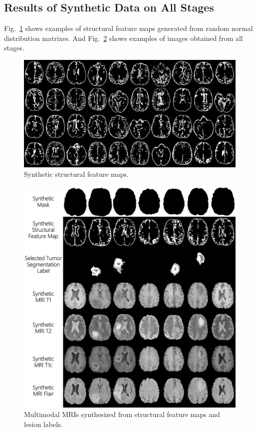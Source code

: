 \documentclass[runningheads]{llncs}
\begin{document}
\subsection{Results of Synthetic Data on All Stages}
Fig.~\ref{generated_f} shows examples of structural feature maps generated from random normal distribution matrixes. And Fig.~\ref{generated_mri} shows examples of images obtained from all stages.
\begin{figure}
	\centering
	\includegraphics[width=0.95\linewidth]{figures/Fs}
	\caption{Synthetic structural feature maps.}
	\label{generated_f}
\end{figure}

\begin{figure}
	\centering
	\includegraphics[width=0.98\linewidth]{figures/F_to_MRI}
	\caption{Multimodal MRIs synthesized from structural feature maps and lesion labels.}
	\label{generated_mri}
\end{figure}
\end{document}
